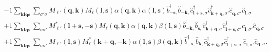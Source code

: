 \begin{align*}
	&-1 \sum_{ \mathbf{k} \mathbf{l} \mathbf{q} \mathbf{s} } \sum_{ \sigma' \sigma } M_{\ell'}( \mathbf{q}, \mathbf{k} )  M_{\ell}( \mathbf{l}, \mathbf{s} )  \alpha( \mathbf{q}, \mathbf{k} )  \alpha( \mathbf{l}, \mathbf{s} )   \hat{b}_{ -\mathbf{s}, }^\dagger  \hat{b}_{ -\mathbf{k}, }^\dagger  \hat{c}_{ \mathbf{l}+\mathbf{s}, \sigma }^\dagger  \hat{c}_{ \mathbf{k}+\mathbf{q}, \sigma' }^\dagger  \hat{c}_{ \mathbf{q}, \sigma' }^{\phantom{\dagger}} \hat{c}_{ \mathbf{l}, \sigma }^{\phantom{\dagger}}  \\
	&+1 \sum_{ \mathbf{k} \mathbf{l} \mathbf{q} \mathbf{s} } \sum_{ \sigma \sigma' } M_{\ell'}^*( \mathbf{l}+\mathbf{s}, -\mathbf{s} )  M_{\ell}( \mathbf{q}, \mathbf{k} )  \alpha( \mathbf{q}, \mathbf{k} )  \beta( \mathbf{l}, \mathbf{s} )   \hat{b}_{ -\mathbf{k}, }^\dagger  \hat{b}_{ \mathbf{s}, }^{\phantom{\dagger}} \hat{c}_{ \mathbf{k}+\mathbf{q}, \sigma }^\dagger  \hat{c}_{ \mathbf{l}+\mathbf{s}, \sigma' }^\dagger  \hat{c}_{ \mathbf{l}, \sigma' }^{\phantom{\dagger}} \hat{c}_{ \mathbf{q}, \sigma }^{\phantom{\dagger}}  \\
	&+1 \sum_{ \mathbf{k} \mathbf{l} \mathbf{q} \mathbf{s} } \sum_{ \sigma \sigma' } M_{\ell'}( \mathbf{l}, \mathbf{s} )  M_{\ell}^*( \mathbf{k}+\mathbf{q}, -\mathbf{k} )  \alpha( \mathbf{l}, \mathbf{s} )  \beta( \mathbf{q}, \mathbf{k} )   \hat{b}_{ -\mathbf{s}, }^\dagger  \hat{b}_{ \mathbf{k}, }^{\phantom{\dagger}} \hat{c}_{ \mathbf{k}+\mathbf{q}, \sigma }^\dagger  \hat{c}_{ \mathbf{l}+\mathbf{s}, \sigma' }^\dagger  \hat{c}_{ \mathbf{l}, \sigma' }^{\phantom{\dagger}} \hat{c}_{ \mathbf{q}, \sigma }^{\phantom{\dagger}} 
. \end{align*}
